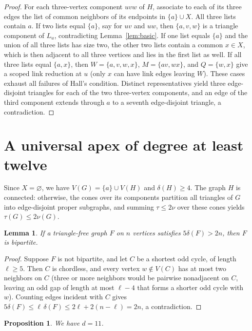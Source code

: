 \documentclass[11pt]{article}
\newtheorem{lemma}[theorem]{Lemma}
\newtheorem{proposition}[theorem]{Proposition}
\begin{document}
\begin{proof}
For each three-vertex component $uvw$ of $H$, associate to each of its three edges the list of common neighbors of its endpoints in $\{a\}\cup X$. All three lists contain $a$. If two lists equal $\{a\}$, say for $uv$ and $uw$, then $\{a,v,w\}$ is a triangle component of $L_u$, contradicting Lemma~\ref{lem:basic}. If one list equals $\{a\}$ and the union of all three lists has size two, the other two lists contain a common $x\in X$, which is then adjacent to all three vertices and lies in the first list as well. If all three lists equal $\{a,x\}$, then $W=\{a,v,w,x\}$, $M=\{av,wx\}$, and $Q=\{w,x\}$ give a scoped link reduction at $u$ (only $x$ can have link edges leaving $W$). These cases exhaust all failures of Hall's condition. Distinct representatives yield three edge-disjoint triangles for each of the two three-vertex components, and an edge of the third component extends through $a$ to a seventh edge-disjoint triangle, a contradiction.
\end{proof}

\section{A universal apex of degree at least twelve}

Since $X=\varnothing$, we have $V(G)=\{a\}\cup V(H)$ and $\delta(H)\geq 4$. The graph $H$ is connected: otherwise, the cones over its components partition all triangles of $G$ into edge-disjoint proper subgraphs, and summing $\tau\leq 2\nu$ over these cones yields $\tau(G)\leq 2\nu(G)$.

\begin{lemma}\label{lem:odd-cycle}
If a triangle-free graph $F$ on $n$ vertices satisfies $5\delta(F)>2n$, then $F$ is bipartite.
\end{lemma}

\begin{proof}
Suppose $F$ is not bipartite, and let $C$ be a shortest odd cycle, of length $\ell\geq 5$. Then $C$ is chordless, and every vertex $w\notin V(C)$ has at most two neighbors on $C$ (three or more neighbors would be pairwise nonadjacent on $C$, leaving an odd gap of length at most $\ell-4$ that forms a shorter odd cycle with $w$). Counting edges incident with $C$ gives $5\delta(F)\leq\ell\,\delta(F)\leq 2\ell+2(n-\ell)=2n$, a contradiction.
\end{proof}

\begin{proposition}\label{prop:deg12plus}
We have $d=11$.
\end{proposition}
\end{document}
